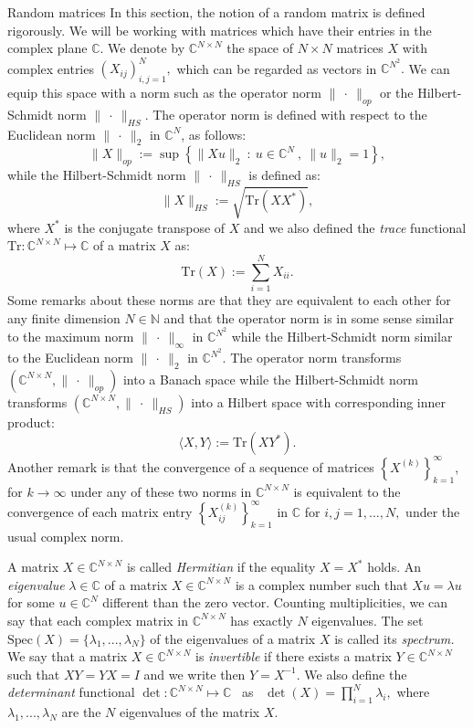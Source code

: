 \documentclass[11pt, a4paper, oneside]{book}
\numberwithin{equation}{chapter}
\begin{document}
\begin{section}{Random matrices}
In this section, the notion of a random matrix is defined rigorously. We will be working with matrices which have their entries in the complex plane $\mathbb{C}.$ We denote by $\mathbb{C}^{N \times N}$ the space of $N \times N$ matrices $X$ with complex entries $(X_{ij})_{i,j=1}^N,$ which can be regarded as vectors in $\mathbb{C}^{N^2}.$ We can equip this space with a norm such as the operator norm $\| \ \cdot \ \|_{op}$ or the Hilbert-Schmidt norm $\| \ \cdot \ \|_{HS}.$ The operator norm is defined with respect to the Euclidean norm $\| \ \cdot \ \|_2$ in $\mathbb{C}^N$, as follows:
%
\[
\|X\|_{op} := \sup \left \{ \|Xu\|_2 \ :\ u \in \mathbb{C}^N \ , \ \|u\|_2=1 \right \},
\]
%
while the Hilbert-Schmidt norm $\| \ \cdot \ \|_{HS} $ is defined as:
%
\[
\|X\|_{HS} := \sqrt{\mathrm{Tr} (XX^*)},
\]
%
where $X^*$ is the conjugate transpose of $X$ and we also defined the \textit{trace} functional $\mathrm{Tr}: \mathbb{C}^{N \times N} \mapsto \mathbb{C}$ of a matrix $X$ as:
%
\[
\mathrm{Tr}(X) := \sum \limits_{i=1}^N X_{ii}.
\]
%
Some remarks about these norms are that they are equivalent to each other for any finite dimension $N \in \mathbb{N}$ and that the operator norm is in some sense similar to the maximum norm $\| \ \cdot \ \|_\infty$ in $\mathbb{C}^{N^2}$ while the Hilbert-Schmidt norm similar to the Euclidean norm $\| \ \cdot \ \|_2$ in $\mathbb{C}^{N^2}.$ The operator norm transforms $(\mathbb{C}^{N \times N},\|\ \cdot \ \|_{op})$ into a Banach space while the Hilbert-Schmidt norm transforms $(\mathbb{C}^{N \times N},\|\ \cdot \ \|_{HS})$ into a Hilbert space with corresponding inner product:
%
\[ 
\langle X,Y \rangle := \mathrm{Tr} (XY^*). 
\]
%
Another remark is that the convergence of a sequence of matrices $\left \{ X^{(k)} \right \}_{k=1}^\infty $, for $k \to \infty$ under any of these two norms in $\mathbb{C}^{N \times N}$ is equivalent to the convergence of each matrix entry $\left \{ X_{ij}^{(k)} \right \}_{k=1}^\infty $ in $\mathbb{C}$ for $i,j=1,...,N,$ under the usual complex norm.

A matrix $X \in \mathbb{C}^{N \times N}$ is called \textit{Hermitian} if the equality $X=X^*$ holds. An \textit{eigenvalue} $\lambda \in \mathbb{C}$ of a matrix $X \in \mathbb{C}^{N \times N}$ is a complex number such that $Xu=\lambda u$ for some $u\in \mathbb{C}^N$ different than the zero vector. Counting multiplicities, we can say that each complex matrix in $\mathbb{C}^{N \times N}$ has exactly $N$ eigenvalues. The set $\mathrm{Spec}(X)=\{ \lambda_1,...,\lambda_N \} $ of the eigenvalues of a matrix $X$ is called its \textit{spectrum.} We say that a matrix $X\in \mathbb{C}^{N\times N}$ is \textit{invertible} if there exists a matrix $Y\in \mathbb{C}^{N \times N}$ such that $XY=YX=I$ and we write then $Y=X^{-1}.$ We also define the \textit{determinant} functional $\det : \mathbb{C}^{N \times N} \mapsto \mathbb{C}$ \ as \ $\det(X) = \prod \limits_{i=1}^N \lambda_i,$ where $\lambda_1,...,\lambda_N$ are the $N$ eigenvalues of the matrix $X.$


\end{section}
\end{document}
